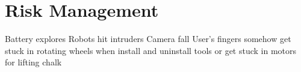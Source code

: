 
\section{Risk Management}
\label{sec:risk}

Battery explores
Robots hit intruders 
Camera fall
User's fingers somehow get stuck in rotating wheels when install and uninstall tools or get stuck in motors for lifting chalk
